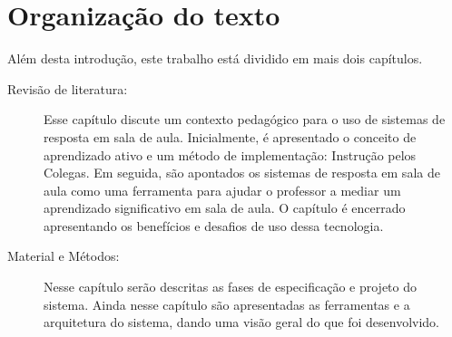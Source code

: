 \section{Organização do texto}
Além desta introdução, este trabalho está dividido em mais dois capítulos.

\begin{description}
  \item[Revisão de literatura:] Esse capítulo discute um contexto pedagógico
  para o uso de sistemas de resposta em sala de aula. Inicialmente, é
  apresentado o conceito de aprendizado ativo e um método de implementação: Instrução pelos Colegas.
  Em seguida, são apontados os sistemas de resposta em sala de aula como uma
  ferramenta para ajudar o professor a mediar um aprendizado significativo  em
  sala de aula. O capítulo é encerrado apresentando os benefícios e desafios de uso dessa tecnologia.

  \item[Material e Métodos:] Nesse capítulo serão descritas as fases de especificação e projeto do sistema.
  Ainda nesse capítulo são apresentadas as ferramentas e a arquitetura
  do sistema, dando uma visão geral do que foi desenvolvido.

\end{description}
